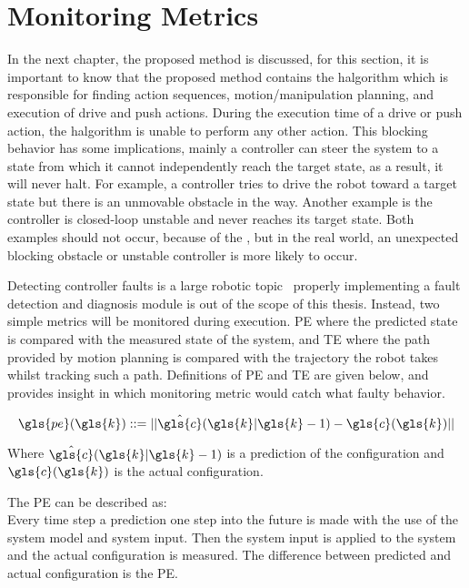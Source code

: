 \section{Monitoring Metrics}%
\label{sec:monitoring_metrics}
In the next chapter, the proposed method is discussed, for this section, it is important to know that the proposed method contains the \ac{halgorithm} which is responsible for finding action sequences, motion/manipulation planning, and execution of drive and push actions. During the execution time of a drive or push action, the \acl{halgorithm} is unable to perform any other action. This blocking behavior has some implications, mainly a controller can steer the system to a state from which it cannot independently reach the target state, as a result, it will never halt. For example, a controller tries to drive the robot toward a target state but there is an unmovable obstacle in the way. Another example is the controller is closed-loop unstable and never reaches its target state. Both examples should not occur, because of the , but in the real world, an unexpected blocking obstacle or unstable controller is more likely to occur.\bs

Detecting controller faults is a large robotic topic~\cite{khalastchi_fault_2019} properly implementing a fault detection and diagnosis module is out of the scope of this thesis. Instead, two simple metrics will be monitored during execution. \ac{PE} where the predicted state is compared with the measured state of the system, and \ac{TE} where the path provided by motion planning is compared with the trajectory the robot takes whilst tracking such a path. Definitions of \ac{PE} and \ac{TE} are given below, and  provides insight in which monitoring metric would catch what faulty behavior.\bs

\[ \gls{pe}(\gls{k}) ::= ||\hat{\gls{c}}(\gls{k}|\gls{k}-1) - \gls{c}(\gls{k})|| \]

Where $\hat{\gls{c}}(\gls{k}|\gls{k}-1)$ is a prediction of the configuration and $\gls{c}(\gls{k})$ is the actual configuration.\bs

The \ac{PE} can be described as:\\
Every time step a prediction one step into the future is made with the use of the system model and system input. Then the system input is applied to the system and the actual configuration is measured. The difference between predicted and actual configuration is the \ac{PE}.

